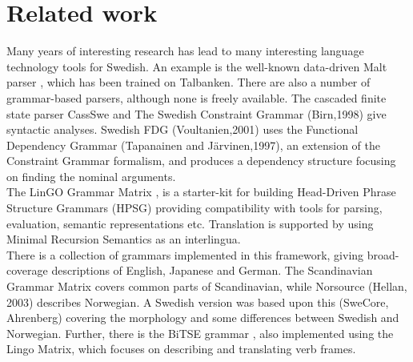 \documentclass{report}
\begin{document}
\section{Related work}
\label{sec:related}
Many years of interesting research has lead to many interesting language
technology tools for Swedish.
An example is the well-known data-driven Malt parser \cite{malt},
which has been trained on Talbanken. 
There are also a number of grammar-based parsers, although none is freely available.
The cascaded finite state parser CassSwe \cite{casswe} and
The Swedish Constraint Grammar (Birn,1998) 
give syntactic analyses. %
Swedish FDG (Voultanien,2001) uses the Functional Dependency Grammar
(Tapanainen and Järvinen,1997), an extension of the Constraint Grammar
formalism, and produces a dependency structure focusing on finding the nominal
arguments. \\


The LinGO Grammar Matrix \cite{matrix}, is a starter-kit for building Head-Driven Phrase
Structure Grammars \cite{hpsg} (HPSG) providing compatibility with tools for
parsing, evaluation, semantic representations etc.
Translation is supported by using Minimal Recursion
Semantics \cite{mrs} as an interlingua. \\
There is a collection of grammars implemented in this framework, giving broad-coverage
descriptions of %
English, Japanese and German. %
The Scandinavian Grammar Matrix \cite{scandmatrix} covers common parts of
Scandinavian, while Norsource (Hellan, 2003) describes Norwegian. A Swedish version
was based upon this (SweCore, Ahrenberg) covering the morphology and some
differences between Swedish and Norwegian. Further, there is the BiTSE 
grammar \cite{stymne}, also implemented using the Lingo Matrix,
which focuses on describing and translating verb frames.\\ %

\end{document}
